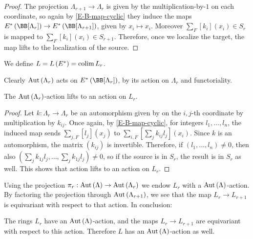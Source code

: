 \begin{proof}
	The projection $\Lambda_{r+1} \to \Lambda_r$ is given by the multiplication-by-$1$ on each coordinate, so again by \ref{E-B-map-cyclic} they induce the maps $E^*\left(\BB[\Lambda_r]\right) \to E^*\left(\BB[\Lambda_{r+1}]\right)$, given by $x_i \mapsto x_i$.
	Moreover $\sum_F [k_i]\left(x_i\right) \in S_r$ is mapped to $\sum_F [k_i]\left(x_i\right) \in S_{r+1}$.
	Therefore, once we localize the target, the map lifts to the localization of the source.
\end{proof}

\begin{definition}
	We define $L = L\left(E^*\right) = \operatorname{colim} L_r$.
\end{definition}

Clearly $\operatorname{Aut}\left(\Lambda_r\right)$ acts on $E^*\left(\BB[\Lambda_r]\right)$, by its action on $\Lambda_r$ and functoriality.

\begin{proposition}
	The $\operatorname{Aut}\left(\Lambda_r\right)$-action lifts to an action on $L_r$.
\end{proposition}

\begin{proof}
	Let $k: \Lambda_r \to \Lambda_r$ be an automorphism given by on the $i,j$-th coordinate by multiplication by $k_{ij}$.
	Once again, by \ref{E-B-map-cyclic}, for integers $l_1, \dotsc, l_n$, the induced map sends $\sum_{j,F} [l_j]\left(x_j\right)$ to $\sum_{i,F}\left[\sum_j k_{ij} l_j\right]\left(x_i\right)$.
	Since $k$ is an automorphism, the matrix $\left(k_{ij}\right)$ is invertible.
	Therefore, if $\left(l_1, \dotsc, l_n\right) \neq 0$, then also $\left(\sum_j k_{1j} l_j, \dotsc, \sum_j k_{1j} l_j\right) \neq 0$, so if the source is in $S_r$, the result is in $S_r$ as well.
	This shows that action lifts to an action on $L_r$.
\end{proof}


Using the projection $\pi_r: \operatorname{Aut}\left(\Lambda\right) \to \operatorname{Aut}\left(\Lambda_r\right)$ we endow $L_r$ with a $\operatorname{Aut}\left(\Lambda\right)$-action.
By factoring the projection through $\operatorname{Aut}\left(\Lambda_{r+1}\right)$, we see that the map $L_r \to L_{r+1}$ is equivariant with respect to that action.
In conclusion:

\begin{proposition}
	The rings $L_r$ have an $\operatorname{Aut}\left(\Lambda\right)$-action, and the maps $L_r \to L_{r+1}$ are equivariant with respect to this action.
	Therefore $L$ has an $\operatorname{Aut}\left(\Lambda\right)$-action as well.
\end{proposition}

